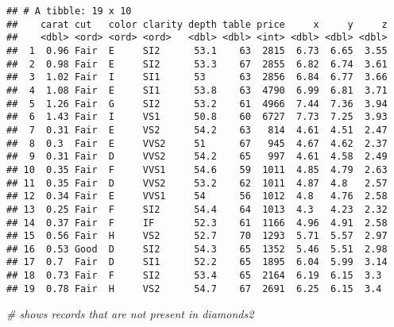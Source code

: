 \documentclass[
]{article}
\newenvironment{Shaded}{\begin{snugshade}}{\end{snugshade}}
\newcommand{\CommentTok}[1]{\textcolor[rgb]{0.56,0.35,0.01}{\textit{#1}}}
\begin{document}
\begin{verbatim}
## # A tibble: 19 x 10
##    carat cut   color clarity depth table price     x     y     z
##    <dbl> <ord> <ord> <ord>   <dbl> <dbl> <int> <dbl> <dbl> <dbl>
##  1  0.96 Fair  E     SI2      53.1    63  2815  6.73  6.65  3.55
##  2  0.98 Fair  E     SI2      53.3    67  2855  6.82  6.74  3.61
##  3  1.02 Fair  I     SI1      53      63  2856  6.84  6.77  3.66
##  4  1.08 Fair  E     SI1      53.8    63  4790  6.99  6.81  3.71
##  5  1.26 Fair  G     SI2      53.2    61  4966  7.44  7.36  3.94
##  6  1.43 Fair  I     VS1      50.8    60  6727  7.73  7.25  3.93
##  7  0.31 Fair  E     VS2      54.2    63   814  4.61  4.51  2.47
##  8  0.3  Fair  E     VVS2     51      67   945  4.67  4.62  2.37
##  9  0.31 Fair  D     VVS2     54.2    65   997  4.61  4.58  2.49
## 10  0.35 Fair  F     VVS1     54.6    59  1011  4.85  4.79  2.63
## 11  0.35 Fair  D     VVS2     53.2    62  1011  4.87  4.8   2.57
## 12  0.34 Fair  E     VVS1     54      56  1012  4.8   4.76  2.58
## 13  0.25 Fair  F     SI2      54.4    64  1013  4.3   4.23  2.32
## 14  0.37 Fair  F     IF       52.3    61  1166  4.96  4.91  2.58
## 15  0.56 Fair  H     VS2      52.7    70  1293  5.71  5.57  2.97
## 16  0.53 Good  D     SI2      54.3    65  1352  5.46  5.51  2.98
## 17  0.7  Fair  D     SI1      52.2    65  1895  6.04  5.99  3.14
## 18  0.73 Fair  F     SI2      53.4    65  2164  6.19  6.15  3.3 
## 19  0.78 Fair  H     VS2      54.7    67  2691  6.25  6.15  3.4
\end{verbatim}

\begin{Shaded}
\begin{Highlighting}[]
\CommentTok{\# shows records that are not present in diamonds2}
\end{Highlighting}
\end{Shaded}
\end{document}
